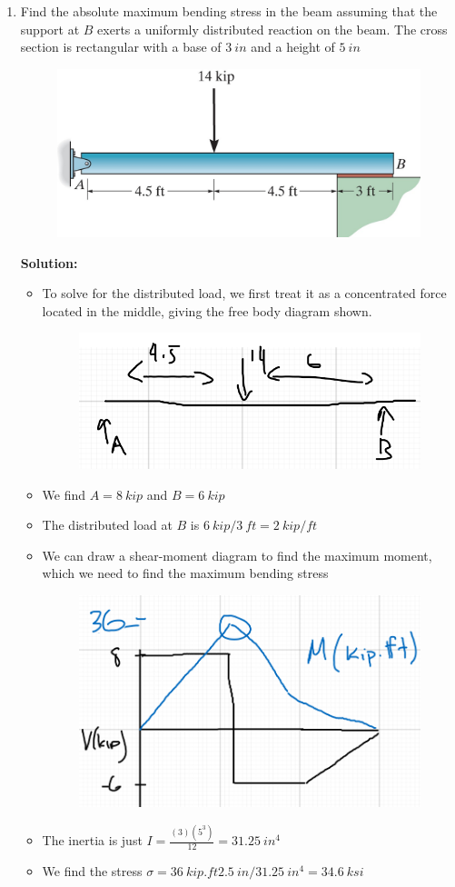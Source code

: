 \documentclass[12pt, oneside]{article}
\let\US\SI
\begin{document}
\begin{enumerate}
	\item %
		Find the absolute maximum bending stress in the beam assuming that the support at $B$ exerts a uniformly distributed reaction on the beam.
		The cross section is rectangular with a base of $\US{3}{in}$ and a height of $\US{5}{in}$
		\begin{figure}[H]
			\centering
			\includegraphics[width=0.6\linewidth]{6-93}
		\end{figure}
			\textbf{Solution:}
			\begin{itemize}
				\item To solve for the distributed load, we first treat it as a concentrated force located in the middle, giving the free body diagram shown.
					\begin{figure}[H]
						\centering
						\includegraphics[width=0.6\linewidth]{5-5}
					\end{figure}
				\item We find $A = 	\US{8 }{kip} $ and $B = 	\US{6 }{kip} $
				\item The distributed load at $B$ is $ 	\US{6 }{kip} / 	\US{3 }{ft} = 	\US{2 }{kip/ft}  $
				\item We can draw a shear-moment diagram to find the maximum moment, which we need to find the maximum bending stress
					\begin{figure}[H]
						\centering
						\includegraphics[width=0.6\linewidth]{5-5a}
					\end{figure}
				\item The inertia is just $I = \frac{(3)(5^3)}{12} = 	\US{31.25 }{in^4} $
				\item We find the stress $\sigma = 	\US{36}{kip.ft} 	\US{2.5 }{in} / 	\US{31.25}{in^4} = 	\US{34.6 }{ksi}  $
			\end{itemize}


\end{enumerate}
\end{document}
